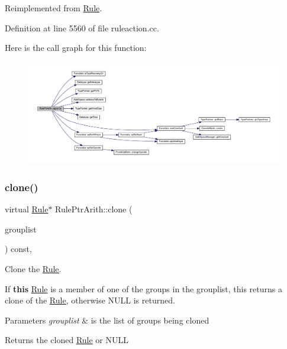 Reimplemented from \mbox{\hyperlink{class_rule_a4e3e61f066670175009f60fb9dc60848}{Rule}}.



Definition at line 5560 of file ruleaction.\+cc.

Here is the call graph for this function\+:
\nopagebreak
\begin{figure}[H]
\begin{center}
\leavevmode
\includegraphics[width=350pt]{class_rule_ptr_arith_a8b6d5d16ceb0884f97bebd712b9f6852_cgraph}
\end{center}
\end{figure}
\mbox{\label{class_rule_ptr_arith_afe0c04cbed0b86e6c09ca29f4514531f}} 
\subsubsection{\texorpdfstring{clone()}{clone()}}
{\footnotesize\ttfamily virtual \mbox{\hyperlink{class_rule}{Rule}}$\ast$ Rule\+Ptr\+Arith\+::clone (\begin{DoxyParamCaption}\item[{const \mbox{\hyperlink{class_action_group_list}{Action\+Group\+List}} \&}]{grouplist }\end{DoxyParamCaption}) const\hspace{0.3cm}{\ttfamily [inline]}, {\ttfamily [virtual]}}



Clone the \mbox{\hyperlink{class_rule}{Rule}}. 

If {\bfseries{this}} \mbox{\hyperlink{class_rule}{Rule}} is a member of one of the groups in the grouplist, this returns a clone of the \mbox{\hyperlink{class_rule}{Rule}}, otherwise N\+U\+LL is returned. 
\begin{DoxyParams}{Parameters}
{\em grouplist} & is the list of groups being cloned \\
\hline
\end{DoxyParams}
\begin{DoxyReturn}{Returns}
the cloned \mbox{\hyperlink{class_rule}{Rule}} or N\+U\+LL 
\end{DoxyReturn}


